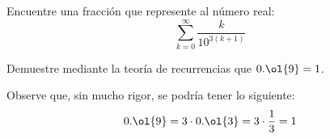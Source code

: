 \begin{ejercicio}
    Encuentre una fracción que represente al número real:
    \begin{equation*}
        \sum_{k=0}^{\infty} \dfrac{k}{10^{3(k+1)}}
    \end{equation*}
\end{ejercicio}



\begin{ejercicio}
    Demuestre mediante la teoría de recurrencias que $0.\ol{9}=1$.
    \begin{observacion}
        Observe que, sin mucho rigor, se podría tener lo siguiente:
        \begin{equation*}
            0.\ol{9} = 3\cdot 0.\ol{3} = 3\cdot \dfrac{1}{3} = 1
        \end{equation*}
    \end{observacion}
\end{ejercicio}